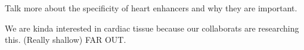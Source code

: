         
        Talk more about the specificity of heart enhancers and why they are important.

        We are kinda interested in cardiac tissue because our collaborats are researching this. (Really shallow)
        FAR OUT. 
        


        
        
        
        

        


